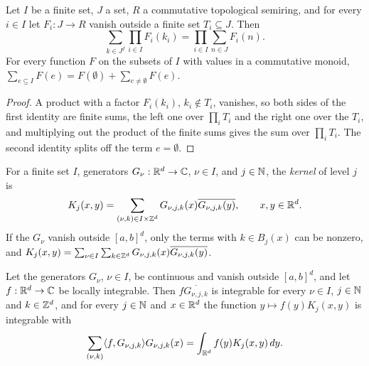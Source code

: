\begin{lemma}
\label{lem:rd-tsum-prod}
\leanok
Let $I$ be a finite set, $J$ a set, $R$ a commutative topological semiring, and for every
$i \in I$ let $F_i : J \to R$ vanish outside a finite set $T_i \subseteq J$. Then
\[
  \sum_{k \in J^I} \prod_{i \in I} F_i(k_i) = \prod_{i \in I} \sum_{n \in J} F_i(n) .
\]
For every function $F$ on the subsets of $I$ with values in a commutative monoid,
$\sum_{e \subseteq I} F(e) = F(\emptyset) + \sum_{e \neq \emptyset} F(e)$.
\end{lemma}

\begin{proof}
\leanok
A product with a factor $F_i(k_i)$, $k_i \notin T_i$, vanishes, so both sides of the first
identity are finite sums, the left one over $\prod_i T_i$ and the right one over the $T_i$, and
multiplying out the product of the finite sums gives the sum over $\prod_i T_i$. The second
identity splits off the term $e = \emptyset$.
\end{proof}

\begin{definition}
\label{def:daub-rd-kernel}
\leanok
{}
For a finite set $I$, generators $G_\nu : \mathbb{R}^d \to \mathbb{C}$, $\nu \in I$, and $j \in \mathbb{N}$, the
\emph{kernel} of level $j$ is
\[
  K_j(x, y) = \sum_{(\nu, k) \in I \times \mathbb{Z}^d} G_{\nu,j,k}(x) \overline{G_{\nu,j,k}(y)} ,
  \qquad x, y \in \mathbb{R}^d .
\]
If the $G_\nu$ vanish outside $[a, b]^d$, only the terms with $k \in B_j(x)$ can be nonzero, and
$K_j(x, y) = \sum_{\nu \in I} \sum_{k \in \mathbb{Z}^d} G_{\nu,j,k}(x) \overline{G_{\nu,j,k}(y)}$.
\end{definition}

\begin{lemma}
\label{lem:daub-rd-kernel-form}
\leanok
{}
Let the generators $G_\nu$, $\nu \in I$, be continuous and vanish outside $[a, b]^d$, and let
$f : \mathbb{R}^d \to \mathbb{C}$ be locally integrable. Then $f \overline{G_{\nu,j,k}}$ is integrable for every
$\nu \in I$, $j \in \mathbb{N}$ and $k \in \mathbb{Z}^d$, and for every $j \in \mathbb{N}$ and $x \in \mathbb{R}^d$ the function
$y \mapsto f(y) K_j(x, y)$ is integrable with
\[
  \sum_{(\nu, k)} \langle f, G_{\nu,j,k} \rangle G_{\nu,j,k}(x)
  = \int_{\mathbb{R}^d} f(y) K_j(x, y) \, dy .
\]
\end{lemma}

